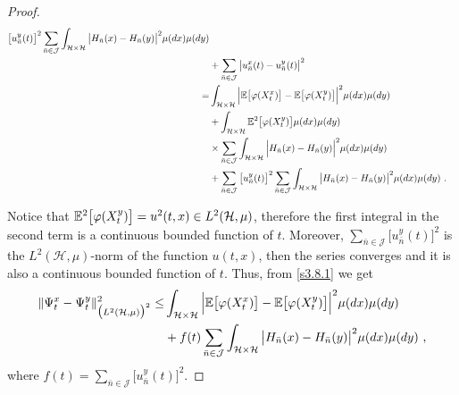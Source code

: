 \documentclass[review, onefignum, onetabnum]{siamart171218}
\begin{document}
\begin{proof}
\begin{equation}
\begin{aligned}
            \big[
                u_{\bar n}^y(t)
            \big] ^ 2
            \sum_{\bar n\in \mathcal{J}}
            \int_{\mathcal{H}\times \mathcal{H}}
            \big|
                H_{\bar n}(x) -H_{\bar n}(y)
            \big|^2 \mu(dx) \mu(dy)
            \\
            &+
            \sum_{\bar n\in \mathcal{J}}
                        \big|
                            u_{\bar n}^x(t)-u_{\bar n}^y(t)
                        \big| ^ 2
            \\
            =&
            \int_{\mathcal{H}\times \mathcal{H}}
            \Big|
                \mathbb{E}\big[
                    \varphi(X_t^x)
                \big]
                -
                \mathbb{E}\big[
                    \varphi(X_t^y)
                \big]
            \Big|^2
            \mu(dx)\mu(dy)
            \\
            &+
            \int_{\mathcal{H}\times \mathcal{H}}
            \mathbb{E} ^ 2\big[
                \varphi(X_t^y)
            \big] \mu(dx) \mu(dy)
            \\
            & \times
            \sum_{\bar n\in \mathcal{J}}
            \int_{\mathcal{H}\times \mathcal{H}}
            \Big|
                H_{\bar n}(x) - H_{\bar n}(y)
            \Big|^2  \mu(dx)\mu(dy)
            \\
            &+
            \sum_{\bar n\in \mathcal{J}}
            \big[
                u_{\bar n}^y(t)
            \big]^2
            \sum_{\bar n\in \mathcal{J}}
            \int_{\mathcal{H}\times \mathcal{H}}
            \big|
                H_{\bar n}(x) - H_{\bar n}(y)
            \big|^2 \mu(dx)\mu(dy)
            \ .
    \end{aligned}
\end{equation}

    Notice that
$\mathbb{E}^2\big[\varphi(X_t^y)\big]=u^2(t,x)\in L^2(\mathcal{H},\mu)$,
therefore the first integral in the second term is a continuous bounded
function of $t$. Moreover,
$\sum_{\bar n\in \mathcal{J}} \big[u_{\bar n}^y(t)\big]^2$ is the
$L^2(\mathcal{H},\mu)$-norm of the function $u(t,x)$, then the series
converges and it is also a continuous bounded function of $t$. Thus, from
\eqref{s3.8.1} we get
%
\begin{equation}
\label{s3.9.1}
    \begin{aligned}
        \| \Psi_t^x-\Psi_t^y\|_{\big(L^2(\mathcal{H},\mu) \big)^2}^2
        \le&
        \int_{\mathcal{H}\times \mathcal{H}}
            \Big|
                \E\big [
                    \varphi(X_t^x)
                \big
                ]-
                \E\big[
                    \varphi(X_t^y)
                \big]
            \Big|^2
        \mu(dx)\mu(dy)
        \\
         &+
         f(t)
         \sum_{\bar n\in \mathcal{J}}
         \int_{\mathcal{H}\times \mathcal{H}}
            \big|
                H_{\bar n}(x) - H_{\bar n}(y)
            \big|^2 \mu(dx)\mu(dy) \ ,
    \end{aligned}
\end{equation}
where $f(t)= \sum_{\bar n\in \mathcal{J}} \big[u_{\bar n}^y(t)\big]^2$.


\end{proof}
\end{document}
